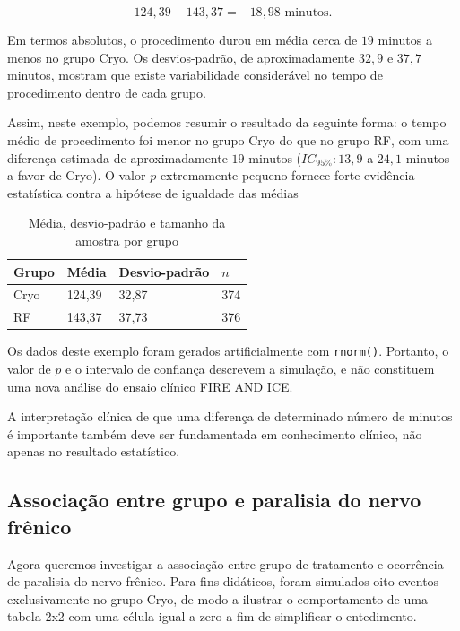 \[
124{,}39 - 143{,}37 = -18{,}98\text{ minutos}.
\]

Em termos absolutos, o procedimento durou em média cerca de $19$ minutos
a menos no grupo Cryo. Os desvios-padrão, de aproximadamente $32{,}9$ e
$37{,}7$ minutos, mostram que existe variabilidade considerável no tempo de
procedimento dentro de cada grupo.

Assim, neste exemplo, podemos resumir o resultado da seguinte forma: o tempo
médio de procedimento foi menor no grupo Cryo do que no grupo RF, com uma
diferença estimada de aproximadamente $19$ minutos
($IC_{95\%}: 13{,}9$ a $24{,}1$ minutos a favor de Cryo). O valor-$p$
extremamente pequeno fornece forte evidência estatística contra a hipótese
de igualdade das médias

\begin{table}[ht]
\centering
\caption{Média, desvio-padrão e tamanho da amostra por grupo}
\begin{tabularx}{0.8\textwidth}{lXXX}
\toprule
\textbf{Grupo} & \textbf{Média} & \textbf{Desvio-padrão} & \textbf{$n$} \\
\midrule
Cryo & 124,39 & 32,87 & 374 \\
RF   & 143,37 & 37,73 & 376 \\
\bottomrule
\end{tabularx}
\end{table}

\begin{error}

Os dados deste exemplo foram gerados artificialmente com \texttt{rnorm()}.
Portanto, o valor de $p$ e o intervalo de confiança descrevem a simulação,
e não constituem uma nova análise do ensaio clínico FIRE AND ICE.

A interpretação clínica de que uma diferença de determinado número de
minutos é importante também deve ser fundamentada em conhecimento clínico,
não apenas no resultado estatístico.
\end{error}

\subsection{Associação entre grupo e paralisia do nervo frênico}

Agora queremos investigar a associação entre grupo de tratamento e ocorrência
de paralisia do nervo frênico. Para fins didáticos, foram simulados oito eventos exclusivamente no grupo Cryo, de modo a ilustrar o comportamento de uma tabela 2x2 com uma célula igual a zero a fim de simplificar o entedimento.


